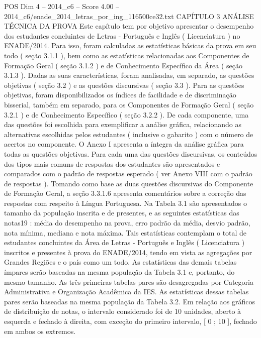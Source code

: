 \begin{textsample}{POS Dim 4 – 2014\_c6 – Score 4.00 – 2014\_c6/enade\_2014\_letras\_por\_ing\_116500ce32.txt}  \label{ex:f4_pos_071}
CAPÍTULO 3 ANÁLISE TÉCNICA DA PROVA Este capítulo tem por objetivo apresentar o desempenho dos estudantes concluintes de Letras - Português e Inglês ( Licenciatura ) no ENADE/2014.
Para isso, foram calculadas as estatísticas básicas da prova em seu todo ( seção 3.1.1 ), bem como as estatísticas relacionadas aos Componentes de Formação Geral ( seção 3.1.2 ) e de Conhecimento Específico da Área ( seção 3.1.3 ).
Dadas as suas características, foram analisadas, em separado, as questões objetivas ( seção 3.2 ) e as questões discursivas ( seção 3.3 ).
Para as questões objetivas, foram disponibilizados os índices de facilidade e de discriminação bisserial, também em separado, para os Componentes de Formação Geral ( seção 3.2.1 ) e de Conhecimento Específico ( seção 3.2.2 ).
De cada componente, uma das questões foi escolhida para exemplificar a análise gráfica, relacionando as alternativas escolhidas pelos estudantes ( inclusive o gabarito ) com o número de acertos no componente.
O Anexo I apresenta a íntegra da análise gráfica para todas as questões objetivas.
Para cada uma das questões discursivas, os conteúdos dos tipos mais comuns de respostas dos estudantes são apresentados e comparados com o padrão de respostas esperado ( ver Anexo VIII com o padrão de respostas ).
Tomando como base as duas questões discursivas do Componente de Formação Geral, a seção 3.3.1.6 apresenta comentários sobre a correção das respostas com respeito à Língua Portuguesa.
Na Tabela 3.1 são apresentados o tamanho da população inscrita e de presentes, e as seguintes estatísticas das notas19 : média do desempenho na prova, erro padrão da média, desvio padrão, nota mínima, mediana e nota máxima.
Tais estatísticas contemplam o total de estudantes concluintes da Área de Letras - Português e Inglês ( Licenciatura ) inscritos e presentes à prova do ENADE/2014, tendo em vista as agregações por Grandes Regiões e o país como um todo.
As estatísticas das demais tabelas ímpares serão baseadas na mesma população da Tabela 3.1 e, portanto, do mesmo tamanho.
As três primeiras tabelas pares são desagregadas por Categoria Administrativa e Organização Acadêmica da IES.
As estatísticas dessas tabelas pares serão baseadas na mesma população da Tabela 3.2.
Em relação aos gráficos de distribuição de notas, o intervalo considerado foi de 10 unidades, aberto à esquerda e fechado à direita, com exceção do primeiro intervalo, [ 0 ; 10 ], fechado em ambos os extremos.

\end{textsample}
